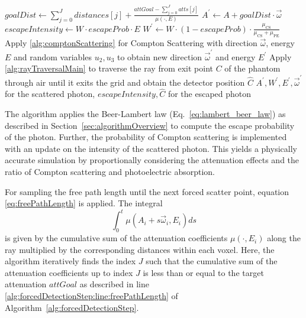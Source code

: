 \begin{algorithm}[H]
\begin{algorithmic}[1]
        \State $goalDist \gets \sum\limits_{j=0}^{J} distances[j] + \frac{attGoal - \sum\limits_{j=0}^{J} atts[j]}{\mu(\cdot, E)}$ 
        \Statex {} \label{alg:forcedDetectionStep:line:freePathLengthEnd}
        \State $A^\prime \gets A + goalDist \cdot \vec{\omega}$
        \State $escapeIntensity \gets W \cdot escapeProb \cdot E$
        \State $W^\prime \gets W \cdot (1 - escapeProb) \cdot \frac{\mu_\textrm{CS}}{\mu_\textrm{CS} + \mu_\textrm{PE}}$
        \State Apply \autoref{alg:comptonScattering} for Compton Scattering with direction $\vec{\omega}$, energy $E$ and random variables $u_2, u_3$ to obtain new direction $\vec{\omega}^\prime$ and energy $E^\prime$ \label{alg:forcedDetectionStep:line:compton}
        \State Apply \autoref{alg:rayTraversalMain} to traverse the ray from exit point $C$ of the phantom through air until it exits the grid and obtain the detector position $\hat{C}$ \label{alg:forcedDetectionStep:line:ExitPoint}
        \State \Return $A^\prime, W^\prime, E^\prime, \vec{\omega}^\prime$ for the scattered photon, $escapeIntensity, \hat{C}$ for the escaped
        \Statex {} photon
    \end{algorithmic}
\end{algorithm}

The algorithm applies the Beer-Lambert law (Eq.~\ref{eq:lambert_beer_law}) as
described in Section~\ref{sec:algorithmOverview} to compute the escape
probability of the photon. Further, the probability of Compton scattering is
implemented with an update on the intensity of the scattered photon. This yields
a physically accurate simulation by proportionally considering the attenuation
effects and the ratio of Compton scattering and photoelectric absorption.

For sampling the free path length until the next forced scatter point, equation
\eqref{eq:freePathLength} is applied. The integral $$\int_0^t \mu(A_i + s
\vec{\omega}_i, E_i) ds$$ is given by the cumulative sum of the attenuation
coefficients $\mu(\cdot, E_i)$ along the ray multiplied by the corresponding
distances within each voxel. Here, the algorithm iteratively finds the index $J$
such that the cumulative sum of the attenuation coefficients up to index $J$ is
less than or equal to the target attenuation $attGoal$ as described in line
\ref{alg:forcedDetectionStep:line:freePathLength} of Algorithm~\ref{alg:forcedDetectionStep}.

